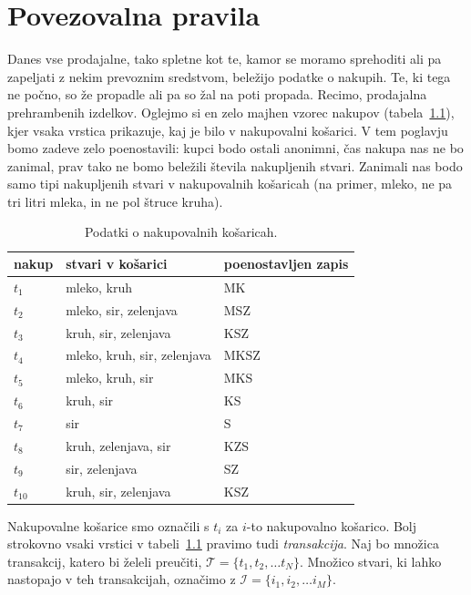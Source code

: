 \chapter{Povezovalna pravila}

Danes vse prodajalne, tako spletne kot te, kamor se moramo sprehoditi ali pa zapeljati z nekim prevoznim sredstvom, beležijo podatke o nakupih. Te, ki tega ne počno, so že propadle ali pa so žal na poti propada. Recimo, prodajalna prehrambenih izdelkov. Oglejmo si en zelo majhen vzorec nakupov  (tabela~\ref{t:transakcije}), kjer vsaka vrstica prikazuje, kaj je bilo v nakupovalni košarici. V tem poglavju bomo zadeve zelo poenostavili: kupci bodo ostali anonimni, čas nakupa nas ne bo zanimal, prav tako ne bomo beležili števila nakupljenih stvari. Zanimali nas bodo samo tipi nakupljenih stvari v nakupovalnih košaricah (na primer, mleko, ne pa tri litri mleka, in ne pol štruce kruha).

\begin{table}
\caption{Podatki o nakupovalnih košaricah.}
\label{t:transakcije}
\begin{center}
\small
\begin{tabular}{lll}
\toprule
nakup & stvari v košarici & poenostavljen zapis \\
\midrule
$t_1$ & mleko, kruh & MK \\
$t_2$ & mleko, sir, zelenjava & MSZ \\
$t_3$ & kruh, sir, zelenjava & KSZ \\
$t_4$ & mleko, kruh, sir, zelenjava & MKSZ \\
$t_5$ & mleko, kruh, sir & MKS \\
$t_6$ & kruh, sir & KS \\
$t_7$ & sir & S \\
$t_8$ & kruh, zelenjava, sir & KZS \\
$t_9$ & sir, zelenjava & SZ \\
$t_{10}$ & kruh, sir, zelenjava & KSZ \\
\bottomrule
\end{tabular}
\end{center}
\end{table}

Nakupovalne košarice smo označili s $t_i$ za $i$-to nakupovalno košarico. Bolj strokovno vsaki vrstici v tabeli~\ref{t:transakcije} pravimo tudi {\em transakcija}. Naj bo množica transakcij, katero bi želeli preučiti, ${\mathcal T}=\{t_1,t_2,\ldots t_N\}$. Množico stvari, ki lahko nastopajo v teh transakcijah, označimo z ${\mathcal I}=\{i_1,i_2,\ldots i_M\}$.

